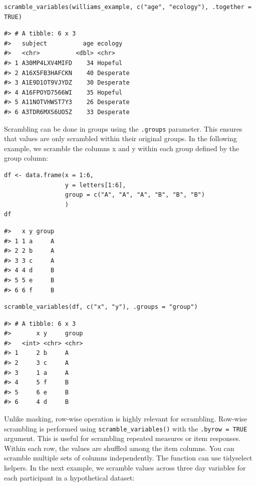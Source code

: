 \begin{verbatim}
scramble_variables(williams_example, c("age", "ecology"), .together = TRUE)
\end{verbatim}

\begin{verbatim}
#> # A tibble: 6 x 3
#>   subject          age ecology  
#>   <chr>          <dbl> <chr>    
#> 1 A30MP4LXV4MIFD    34 Hopeful  
#> 2 A16X5FB3HAFCKN    40 Desperate
#> 3 A1E9D1OT9VJYDZ    30 Desperate
#> 4 A16FPOYD7566WI    35 Hopeful  
#> 5 A11NOTVHWST7Y3    26 Desperate
#> 6 A3TDR6MXS6UO5Z    33 Desperate
\end{verbatim}

Scrambling can be done in groups using the \texttt{.groups} parameter. This ensures that values are only scrambled within their original groups. In the following example, we scramble the columns x and y within each group defined by the group column:

\begin{verbatim}
df <- data.frame(x = 1:6,
                 y = letters[1:6],
                 group = c("A", "A", "A", "B", "B", "B")
                 )
df 
\end{verbatim}

\begin{verbatim}
#>   x y group
#> 1 1 a     A
#> 2 2 b     A
#> 3 3 c     A
#> 4 4 d     B
#> 5 5 e     B
#> 6 6 f     B
\end{verbatim}

\begin{verbatim}
scramble_variables(df, c("x", "y"), .groups = "group")
\end{verbatim}

\begin{verbatim}
#> # A tibble: 6 x 3
#>       x y     group
#>   <int> <chr> <chr>
#> 1     2 b     A    
#> 2     3 c     A    
#> 3     1 a     A    
#> 4     5 f     B    
#> 5     6 e     B    
#> 6     4 d     B
\end{verbatim}

Unlike masking, row-wise operation is highly relevant for scrambling. Row-wise scrambling is performed using \texttt{scramble\_variables()} with the \texttt{.byrow\ =\ TRUE} argument. This is useful for scrambling repeated measures or item responses. Within each row, the values are shuffled among the item columns. You can scramble multiple sets of columns independently. The function can use tidyselect helpers. In the next example, we scramble values across three day variables for each participant in a hypothetical dataset:

